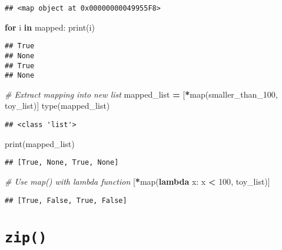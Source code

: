 \documentclass[
]{book}
\newenvironment{Shaded}{\begin{snugshade}}{\end{snugshade}}
\newcommand{\BuiltInTok}[1]{#1}
\newcommand{\CommentTok}[1]{\textcolor[rgb]{0.56,0.35,0.01}{\textit{#1}}}
\newcommand{\ControlFlowTok}[1]{\textcolor[rgb]{0.13,0.29,0.53}{\textbf{#1}}}
\newcommand{\DecValTok}[1]{\textcolor[rgb]{0.00,0.00,0.81}{#1}}
\newcommand{\KeywordTok}[1]{\textcolor[rgb]{0.13,0.29,0.53}{\textbf{#1}}}
\newcommand{\NormalTok}[1]{#1}
\newcommand{\OperatorTok}[1]{\textcolor[rgb]{0.81,0.36,0.00}{\textbf{#1}}}
\begin{document}
\begin{verbatim}
## <map object at 0x00000000049955F8>
\end{verbatim}

\begin{Shaded}
\begin{Highlighting}[]
\ControlFlowTok{for}\NormalTok{ i }\KeywordTok{in}\NormalTok{ mapped:}
    \BuiltInTok{print}\NormalTok{(i)}
\end{Highlighting}
\end{Shaded}

\begin{verbatim}
## True
## None
## True
## None
\end{verbatim}

\begin{Shaded}
\begin{Highlighting}[]
\CommentTok{\# Extract mapping into new list}
\NormalTok{mapped\_list }\OperatorTok{=}\NormalTok{ [}\OperatorTok{*}\BuiltInTok{map}\NormalTok{(smaller\_than\_100, toy\_list)]}
\BuiltInTok{type}\NormalTok{(mapped\_list)}
\end{Highlighting}
\end{Shaded}

\begin{verbatim}
## <class 'list'>
\end{verbatim}

\begin{Shaded}
\begin{Highlighting}[]
\BuiltInTok{print}\NormalTok{(mapped\_list)}
\end{Highlighting}
\end{Shaded}

\begin{verbatim}
## [True, None, True, None]
\end{verbatim}

\begin{Shaded}
\begin{Highlighting}[]
\CommentTok{\# Use map() with lambda function}
\NormalTok{[}\OperatorTok{*}\BuiltInTok{map}\NormalTok{(}\KeywordTok{lambda}\NormalTok{ x: x }\OperatorTok{\textless{}} \DecValTok{100}\NormalTok{, toy\_list)]}
\end{Highlighting}
\end{Shaded}

\begin{verbatim}
## [True, False, True, False]
\end{verbatim}

\hypertarget{zip}{%
\section{\texorpdfstring{\texttt{zip()}}{zip()}}\label{zip}}
\end{document}
